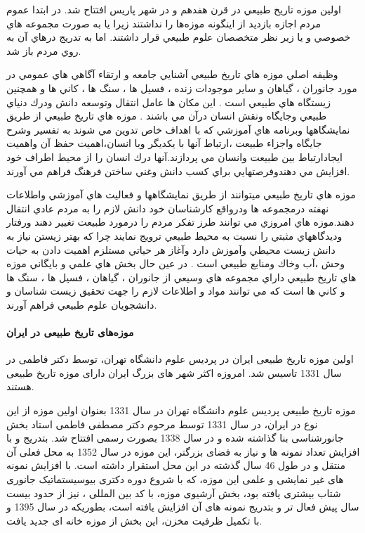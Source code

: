 اولين موزه تاريخ طبيعي در قرن هفدهم و در شهر پاريس افتتاح شد.
در ابتدا عموم مردم اجازه بازديد از اينگونه موزه‌ها را نداشتند زيرا يا به
صورت مجموعه هاي خصوصي و يا زير نظر متخصصان علوم طبيعي قرار داشتند. اما به تدريج درهاي آن به
روي مردم باز شد.

وظيفه اصلي موزه هاي تاريخ طبيعي آشنايي جامعه و ارتقاء آگاهي هاي عمومي در مورد جانوران ، گياهان و 
ساير موجودات زنده ، فسيل ها ، سنگ ها ، كاني ها و همچنين زيستگاه هاي طبيعي است . اين مكان ها 
عامل انتقال وتوسعه دانش ودرك دنياي طبيعي وجايگاه ونقش انسان درآن مي باشند . موزه هاي تاريخ طبيعي
از طريق نمايشگاهها وبرنامه هاي آموزشي كه با اهداف خاص تدوين مي شوند به تفسير وشرح جايگاه واجزاء
طبيعت ،ارتباط آنها با يكديگر وبا انسان،اهميت حفظ آن واهميت ايجادارتباط بين طبيعت وانسان مي
پردازند.آنها درك انسان را از محيط اطراف خود افزايش مي دهندوفرصتهايي براي كسب دانش وغني ساختن
فرهنگ فراهم مي آورند.

موزه هاي تاريخ طبيعي ميتوانند از طريق نمايشگاهها و فعاليت هاي آموزشي واطلاعات
نهفته درمجموعه ها ودرواقع كارشناسان خود دانش لازم را به مردم عادي انتقال دهند.موزه هاي امروزي مي
توانند طرز تفكر مردم را درمورد طبيعت تغيير دهند ورفتار وديدگاههاي مثبتي را نسبت به محيط طبيعي
ترويج نمايند چرا كه بهتر زيستن نياز به دانش زيست محيطي وآموزش دارد وآغاز هر حياتي مستلزم اهميت
دادن به حيات وحش ،آب وخاك ومنابع طبيعي است . در عين حال بخش هاي علمي و بايگاني موزه هاي تاريخ
طبيعي داراي مجموعه هاي وسيعي از جانوران ، گياهان ، فسيل ها ، سنگ ها و كاني ها است كه مي توانند مواد
و اطلاعات لازم را جهت تحقيق زيست شناسان و دانشجويان علوم طبيعي فراهم آورند.


\paragraph*{موزه‌های تاریخ طبیعی در ایران}

اولین موزه تاریخ طبیعی ایران در پردیس علوم دانشگاه تهران، توسط دکتر فاطمی در سال 1331 تاسیس شد. امروزه اکثر شهر های بزرگ ایران دارای موزه تاریخ طبیعی هستند.

موزه تاریخ طبیعی پردیس علوم دانشگاه تهران در سال 1331 بعنوان اولین موزه از این نوع در ایران، در سال 1331 توسط مرحوم دکتر مصطفی فاطمی استاد بخش جانورشناسی بنا گذاشته شده و در سال 1338 بصورت رسمی افتتاح شد. بتدریج و با افزایش تعداد نمونه ها و نیاز به فضای بزرگتر، این موزه در سال 1352 به محل فعلی آن منتقل و در طول 46 سال گذشته در این محل استقرار داشته است. با افزایش نمونه های غیر نمایشی و علمی این موزه، که با شروع دوره دکتری بیوسیستماتیک جانوری شتاب بیشتری یافته بود، بخش آرشیوی موزه، با کد بین المللی ، نیز از حدود بیست سال پیش فعال تر و بتدریج نمونه های آن افزایش یافته است، بطوریکه در سال 1395 و با تکمیل ظرفیت مخزن، این بخش از موزه خانه ای جدید یافت.

